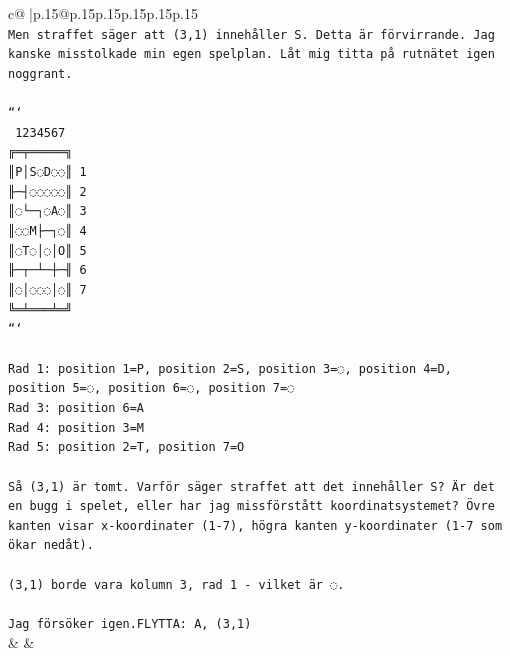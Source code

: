\documentclass{article}
\begin{document}
{\begin{supertabular}{c@{$\;$}|p{.15\linewidth}@{}p{.15\linewidth}p{.15\linewidth}p{.15\linewidth}p{.15\linewidth}p{.15\linewidth}}
{{{\\ 
\texttt{Men straffet säger att (3,1) innehåller S. Detta är förvirrande. Jag kanske misstolkade min egen spelplan. Låt mig titta på rutnätet igen noggrant.} \\
\\ 
\texttt{```} \\
\texttt{ 1234567} \\
\texttt{╔═╤═════╗} \\
\texttt{║P│S◌D◌◌║ 1} \\
\texttt{╟─┤◌◌◌◌◌║ 2} \\
\texttt{║◌└─┐◌A◌║ 3} \\
\texttt{║◌◌M├─┐◌║ 4} \\
\texttt{║◌T◌│◌│O║ 5} \\
\texttt{╟─┬─┴─┼─╢ 6} \\
\texttt{║◌│◌◌◌│◌║ 7} \\
\texttt{╚═╧═══╧═╝} \\
\texttt{```} \\
\\ 
\texttt{Rad 1: position 1=P, position 2=S, position 3=◌, position 4=D, position 5=◌, position 6=◌, position 7=◌} \\
\texttt{Rad 3: position 6=A} \\
\texttt{Rad 4: position 3=M} \\
\texttt{Rad 5: position 2=T, position 7=O} \\
\\ 
\texttt{Så (3,1) är tomt. Varför säger straffet att det innehåller S? Är det en bugg i spelet, eller har jag missförstått koordinatsystemet? Övre kanten visar x{-}koordinater (1{-}7), högra kanten y{-}koordinater (1{-}7 som ökar nedåt).} \\
\\ 
\texttt{(3,1) borde vara kolumn 3, rad 1 {-} vilket är ◌.} \\
\\ 
\texttt{Jag försöker igen.FLYTTA: A, (3,1)} \\
            }
        }
    }
    & & \\ \\


\end{supertabular}}
\end{document}

